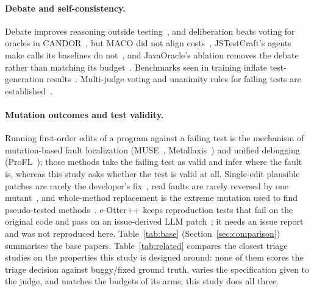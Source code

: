 \documentclass[journal]{IEEEtran}
\begin{document}
\paragraph{Debate and self-consistency.} Debate improves reasoning outside testing~\cite{du2024debate}, and deliberation beats voting for oracles in CANDOR~\cite{xu2026candor}, but MACO did not align costs~\cite{xie2026maco}, JSTestCraft's agents make calls its baselines do not~\cite{liu2026jstestcraft}, and JavaOracle's ablation removes the debate rather than matching its budget~\cite{fu2026javaoracle}. Benchmarks seen in training inflate test-generation results~\cite{huang2026ult}. Multi-judge voting and unanimity rules for failing tests are established~\cite{wang2025json,becker2026jit,zhang2026testagent}.

\paragraph{Mutation outcomes and test validity.} Running first-order edits of a program against a failing test is the mechanism of mutation-based fault localization (MUSE~\cite{moon2014muse}, Metallaxis~\cite{papadakis2015metallaxis}) and unified debugging (ProFL~\cite{lou2020profl}); those methods take the failing test as valid and infer where the fault is, whereas this study asks whether the test is valid at all. Single-edit plausible patches are rarely the developer's fix~\cite{ghanbari2019prapr,qi2015plausibility}, real faults are rarely reversed by one mutant~\cite{pearson2017fl}, and whole-method replacement is the extreme mutation used to find pseudo-tested methods~\cite{niedermayr2016will,vera2018pseudo}. e-Otter++ keeps reproduction tests that fail on the original code and pass on an issue-derived LLM patch~\cite{ahmed2026eotter}; it needs an issue report and was not reproduced here. Table~\ref{tab:base} (Section~\ref{sec:comparison}) summarises the base papers. Table~\ref{tab:related} compares the closest triage studies on the properties this study is designed around: none of them scores the triage decision against buggy/fixed ground truth, varies the specification given to the judge, and matches the budgets of its arms; this study does all three.
\end{document}
